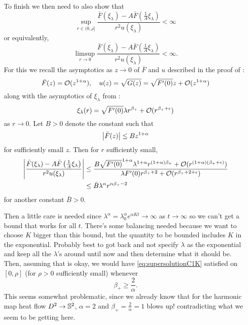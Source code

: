 \documentclass{amsart}
\begin{document}
To finish we then need to also show that
\[
\sup_{r \in (0, \rho]} \frac{\bar{F}(\xi_{\lambda}) - A \bar{F}\left(\tfrac{1}{A} \xi_{\lambda}\right)}{r^{2}u(\xi_{\lambda})} < \infty
\]
or equivalently,
\[
\limsup_{r\to 0} \frac{\bar{F}(\xi_{\lambda}) - A \bar{F}\left(\tfrac{1}{A} \xi_{\lambda}\right)}{r^{2}u(\xi_{\lambda})} < \infty.
\]
For this we recall the asymptotics as \(z \to 0\) of \(\bar{F}\) and \(u\) described in the proof of :
\[
\bar{F}(z) = \bigo(z^{1+\alpha}), \quad u(z) = \sqrt{G(z)} = \sqrt{F'(0)} z + \bigo(z^{1+\alpha})
\]
along with the asymptotics of \(\xi_{\lambda}\) from :
\[
\xi_{\lambda} (r) = \sqrt{F'(0)} \lambda r^{\beta_+} + \bigo(r^{\beta_+ + \epsilon})
\]
as \(r \to 0\). Let \(B > 0\) denote the constant such that
\[
\abs{\bar{F}(z)} \leq B z^{1+\alpha}
\]
for sufficiently small \(z\). Then for \(r\) sufficiently small,
\[
\begin{split}
\abs{\frac{\bar{F}(\xi_{\lambda}) - A \bar{F}\left(\tfrac{1}{A} \xi_{\lambda}\right)}{r^{2}u(\xi_{\lambda})}} &\leq \frac{B \sqrt{F'(0)}^{1+\alpha} \lambda^{1+\alpha} r^{(1+\alpha)\beta_+} + \bigo(r^{(1+\alpha)(\beta_+ + \epsilon)})}{\lambda F'(0) r^{\beta_+ + 2} + \bigo(r^{\beta_+ + 2 + \epsilon})} \\
&\leq \bar{B} \lambda^{\alpha} r^{\alpha\beta_+ - 2}
\end{split}
\]
for another constant \(\bar{B} > 0\).

{\color{red} Then a little care is needed since \(\lambda^{\alpha} = \lambda_0^{\alpha} e^{\alpha Kt} \to \infty\) as \(t \to \infty\) so we can't get a bound that works for all \(t\). There's some balancing needed because we want to choose \(K\) bigger than this bound, but the quantity to be bounded includes \(K\) in the exponential. Probably best to got back and not specify \(\lambda\) as the exponential and keep all the \(\lambda\)'s around until now and then determine what it should be. Then, assuming that is okay, we would have \eqref{eq:supersolutionC1K} satisfied on \([0, \rho]\) (for \(\rho > 0\) sufficiently small) whenever
\[
\beta_+ \geq \frac{2}{\alpha}.
\]
This seems somewhat problematic, since we already know that for the harmonic map heat flow \(D^2 \to \S^2\), \(\alpha = 2\) and \(\beta_+ = \frac{2}{\alpha} = 1\) blows up! contradicting what we seem to be getting here.
}
\end{document}
